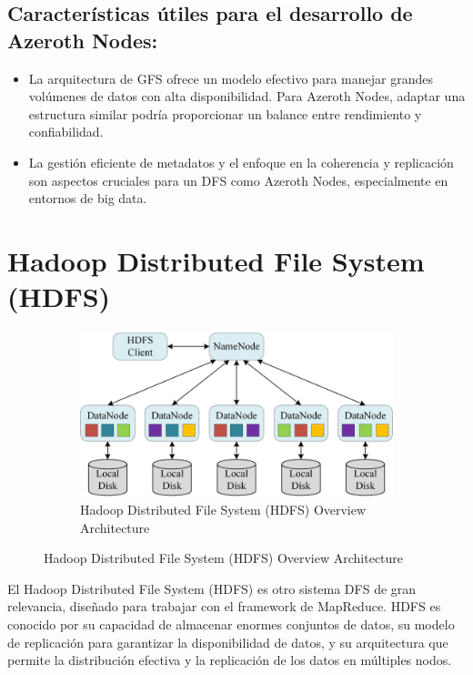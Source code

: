 \subsection{Características útiles para el desarrollo de Azeroth Nodes:}

\begin{itemize}
    \item La arquitectura de GFS ofrece un modelo efectivo para manejar grandes volúmenes de datos con alta disponibilidad. Para Azeroth Nodes, adaptar una estructura similar podría proporcionar un balance entre rendimiento y confiabilidad.
    \item La gestión eficiente de metadatos y el enfoque en la coherencia y replicación son aspectos cruciales para un DFS como Azeroth Nodes, especialmente en entornos de big data.
\end{itemize}

\section{Hadoop Distributed File System (HDFS)}

\begin{figure}[H]
    \centering
    \begin{subfigure}[b]{0.5\textwidth}
        \centering
        \includegraphics[width=\textwidth]{Figures/1. Content/Hadoop-Distributed-File-System-HDFS.png}
        \caption{Hadoop Distributed File System (HDFS) Overview Architecture}
        \label{fig: HDFSArchitecture}
    \end{subfigure}
    \hfill
\end{figure}

El Hadoop Distributed File System (HDFS) es otro sistema DFS de gran relevancia, diseñado para trabajar con el framework de MapReduce. HDFS es conocido por su capacidad de almacenar enormes conjuntos de datos, su modelo de replicación para garantizar la disponibilidad de datos, y su arquitectura que permite la distribución efectiva y la replicación de los datos en múltiples nodos.


